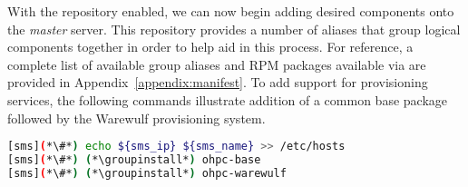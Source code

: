 With the \OHPC{} repository enabled, we can now begin adding desired components onto the
{\em master} server. This repository provides a number of aliases that group
logical components together in order to help aid in this process. For
reference, a complete list of available group aliases and RPM packages available
via \OHPC{} are provided in Appendix~\ref{appendix:manifest}. To add
support for provisioning services, the following commands illustrate addition
of a common base package followed by the Warewulf provisioning system.

\begin{lstlisting}[language=bash,keywords={}]
[sms](*\#*) echo ${sms_ip} ${sms_name} >> /etc/hosts
[sms](*\#*) (*\groupinstall*) ohpc-base
[sms](*\#*) (*\groupinstall*) ohpc-warewulf
\end{lstlisting}

